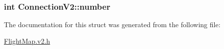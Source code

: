 \subsubsection[{\texorpdfstring{number}{number}}]{\setlength{\rightskip}{0pt plus 5cm}int Connection\+V2\+::number}\hypertarget{struct_connection_v2_a9c84f78e218271fb9950af216b614a4e}{}\label{struct_connection_v2_a9c84f78e218271fb9950af216b614a4e}


The documentation for this struct was generated from the following file\+:\begin{DoxyCompactItemize}
\item 
\hyperlink{_flight_map_8v2_8h}{Flight\+Map.\+v2.\+h}\end{DoxyCompactItemize}
